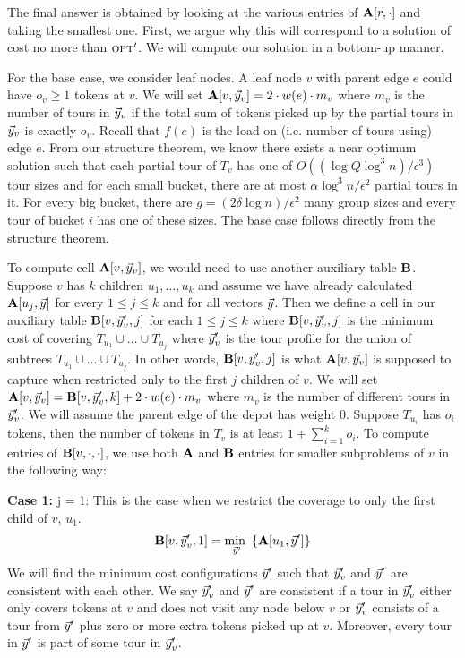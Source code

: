 \documentclass[twoside,leqno]{article}
\newcommand{\opt}{\mbox{\sc opt}}
\newcommand{\mi}[1]{\underset{#1}{\text{min }}}
\newcommand{\eps}{\epsilon}
\begin{document}
The final answer is obtained by looking at the various entries of $\textbf{A}[r, \cdot ]$ and taking the smallest one. First, we argue why this will correspond to a solution of cost no more than $\opt'$. We will compute our solution in a bottom-up manner. 

For the base case, we consider leaf nodes. A leaf node $v$ with parent edge $e$ could have $o_v \ge 1$ tokens at $v$. We will set $\textbf{A}[v,\vec{y}_v] = 2 \cdot w(e) \cdot m_v$ where $m_v$ is the number of tours in $\vec{y}_v$ if the total sum of tokens picked up by the partial tours in $\vec{y}_v$ is exactly $o_v$. Recall that $f(e)$ is the load on (i.e. number of tours using) edge $e$.
From our structure theorem, we know there exists a near optimum solution such that each partial tour 
of $T_v$ has one of $O((\log Q \log^3 n)/\eps^3)$ tour sizes and for each small bucket, there are at most $\alpha \log^3n /\eps^2$ partial tours in it. For every big bucket, there are $g = (2 \delta \log n)/\eps^2$ many group sizes and every tour of bucket $i$ has one of these sizes. The base case follows directly from the structure theorem. 

To compute cell $\textbf{A}[v, \vec{y}_v]$, we would need to use another auxiliary table $\textbf{B}$. Suppose $v$ has $k$ children $u_1, \ldots, u_k$ and assume we have already calculated $\textbf{A}[u_j, \vec{y}]$ for every $1 \le j \le k$ and for all vectors $\vec{y}$. Then we define a cell in our auxiliary table $\textbf{B}[v,\vec{y}_v', j]$ for each $1 \le j \le k$ where $\textbf{B}[v,\vec{y}_v', j]$ is the minimum cost of covering $T_{u_1} \cup \ldots \cup T_{u_j}$ where $\vec{y}_v'$ is the tour profile for the union of subtrees $T_{u_1} \cup \ldots \cup T_{u_j}$. In other words, $\textbf{B}[v, \vec{y}_v', j]$ is what $\textbf{A}[v, \vec{y}_v]$ is supposed to capture when restricted only to the first $j$ children of $v$. We will set $\textbf{A}[v, \vec{y}_v] = \textbf{B}[v, \vec{y}_v', k] + 2 \cdot w(e) \cdot m_v$ where $m_v$ is the number of different tours in $\vec{y}_v'$. We will assume the parent edge of the depot has weight 0. Suppose $T_{u_i}$ has $o_i$ tokens, then the number of tokens in $T_v$ is at least $1 + \sum_{i = 1}^k o_i$. To compute entries of $\textbf{B}[v, \cdot, \cdot]$, we use both $\textbf{A}$ and $\textbf{B}$ entries for smaller subproblems of $v$ in the following way:  

\textbf{Case 1:} j = 1: This is the case when we restrict the coverage to only the first child of $v$, $u_1$. 
\begin{equation*}
    \begin{split}
        \bbold[v,\yvec_v',1] & = \mi{\yvec'} \left\{ \abold[u_1, \yvec'] \right\} \\
    \end{split}
\end{equation*}
We will find the minimum cost configurations $\vec{y}'$ such that $\vec{y}_v'$ and $\vec{y}'$ are consistent with each other. We say $\vec{y}_v'$ and $\vec{y}'$ are consistent if a tour in $\vec{y}_v'$ either only covers tokens at $v$ and does not visit any node below $v$ or $\vec{y}_v'$ consists of a tour from $\vec{y}'$ plus zero or more extra tokens picked up at $v$. Moreover, every tour in $\vec{y}'$ is part of some tour in $\vec{y}_v'$. 
\end{document}
